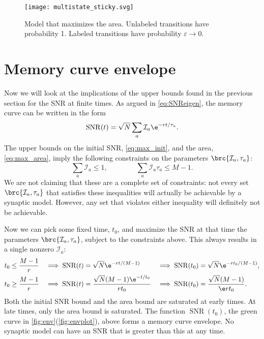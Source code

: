 \documentclass{article} %
\DeclareMathOperator{\snr}{SNR}
\newcommand{\CI}{\mathcal{I}}
\begin{document}
\begin{figure}
 \begin{center}
  \texttt{[image: multistate\_sticky.svg]}
 \end{center}
  \caption{Model that maximizes the area.
  Unlabeled transitions have probability 1.
  Labeled transitions have probability $\varepsilon\to0$.
  }\label{fig:max_area}
\end{figure}



\section{Memory curve envelope}\label{sec:env}

Now we will look at the implications of the upper bounds found in the previous section for the SNR at finite times.
As argued in \eqref{eq:SNReigen}, the memory curve can be written in the form
%
\begin{equation}\label{eq:SNRmodes}
  \snr(t) = \sqrt{N}\sum_a \CI_a \e^{-rt/\tau_a}.
\end{equation}
%
The upper bounds on the initial SNR, \eqref{eq:max_init}, and the area, \eqref{eq:max_area}, imply the following constraints on the parameters $\brc{\CI_a,\tau_a}$:
%
\begin{equation}\label{eq:modeconstr}
  \sum_a \CI_a \leq 1,
  \qquad\qquad
  \sum_a \CI_a \tau_a \leq M-1.
\end{equation}
%
We are not claiming that these are a complete set of constraints: not every set $\brc{\CI_a,\tau_a}$ that satisfies these inequalities will actually be achievable by a synaptic model.
However, any set that violates either inequality will definitely not be achievable.

Now we can pick some fixed time, $t_0$, and maximize the SNR at that time \wrt the parameters $\brc{\CI_a,\tau_a}$, subject to the constraints above.
This always results in a single nonzero $\CI_a$:
%
\begin{equation}\label{eq:env}
\begin{aligned}
  t_0 &\leq \frac{M-1}{r} &
   \implies 
  \snr(t) &= \sqrt{N}\e^{-rt/(M-1)} &
   \implies 
  \snr(t_0) &= \sqrt{N}\e^{-rt_0/(M-1)},\\
  t_0 &\geq \frac{M-1}{r} &
   \implies 
  \snr(t) &= \frac{\sqrt{N}(M-1)\e^{-t/t_0}}{rt_0} &
   \implies 
  \snr(t_0) &= \frac{\sqrt{N}(M-1)}{\e rt_0}.
\end{aligned}
\end{equation}
%
Both the initial SNR bound and the area bound are saturated at early times.
At late times, only the area bound is saturated.
The function $\snr(t_0)$, the green curve in \autoref{fig:env}(\ref{fig:envplot}), above forms a memory curve envelope.
No synaptic model can have an SNR that is greater than this at any time.
\end{document}
